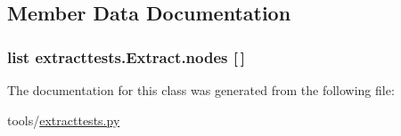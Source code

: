 \subsection{Member Data Documentation}
\hypertarget{classextracttests_1_1_extract_a6d4bd1a8bbda36ecf638651b00cb80c4}{
\subsubsection[{nodes}]{\setlength{\rightskip}{0pt plus 5cm}list extracttests.\-Extract.\-nodes \mbox{[}$\,$\mbox{]}\hspace{0.3cm}{\ttfamily [static]}}}\label{classextracttests_1_1_extract_a6d4bd1a8bbda36ecf638651b00cb80c4}


The documentation for this class was generated from the following file\-:\begin{DoxyCompactItemize}
\item 
tools/\hyperlink{extracttests_8py}{extracttests.\-py}\end{DoxyCompactItemize}
